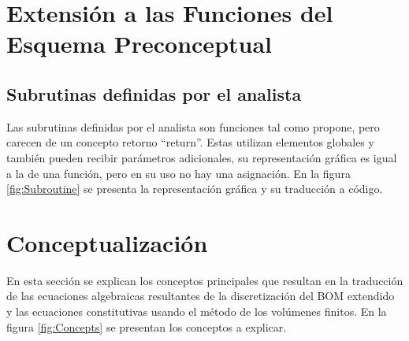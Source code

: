 
\section{Extensión a las Funciones del Esquema Preconceptual}\label{sec:PSNew}
\subsection{Subrutinas definidas por el analista}\label{sec:PS_ADS}
Las subrutinas definidas por el analista son funciones tal como \cite{JCalle} propone, pero carecen de un concepto retorno ``return''. Estas utilizan elementos globales y también pueden recibir parámetros adicionales, su representación gráfica es igual a la de una función, pero en su uso no hay una asignación. En la figura \ref{fig:Subroutine} se presenta la representación gráfica y su traducción a código. %

\section{Conceptualización}\label{sec:Concepts}
En esta sección se explican los conceptos principales que resultan en la traducción de las ecuaciones algebraicas resultantes de la discretización del BOM extendido y las ecuaciones constitutivas usando el método de los volúmenes finitos. En la figura \ref{fig:Concepts} se presentan los conceptos a explicar.

